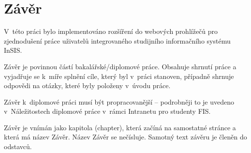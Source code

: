 \chapter*{Závěr}

V~této práci bylo implementováno rozšíření do webových prohlížečů pro zjednodušení práce uživatelů integrovaného studijního informačního systému InSIS.

Závěr je povinnou částí bakalářské/diplomové práce. Obsahuje shrnutí práce a vyjadřuje se k~míře splnění cíle, který byl v~práci stanoven, případně shrnuje odpovědi na otázky, které byly položeny v~úvodu práce. 

Závěr k~diplomové práci musí být propracovanější -- podrobněji to je uvedeno v~Náležitostech diplomové práce v~rámci Intranetu pro studenty FIS.

Závěr je vnímán jako kapitola (chapter), která začíná na samostatné stránce a která má název Závěr.  Název Závěr se nečísluje. Samotný text závěru je členěn do odstavců.